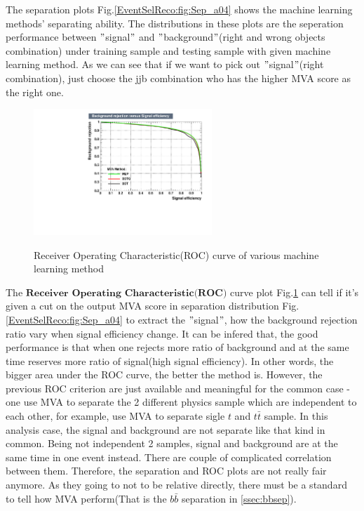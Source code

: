 			The separation plots Fig.\ref{EventSelReco:fig:Sep_a04} shows the machine learning methods' separating ability. The distributions in these plots are the seperation performance between $"$signal$"$ and $"$background$"$(right and wrong objects combination) under training sample and testing sample with given machine learning method. As we can see that if we want to pick out $"$signal$"$(right combination), just choose the jjb combination who has the higher MVA score as the right one.

\begin{figure}[H]
\centering{}
    \includegraphics[width=0.6\textwidth]{Figures/EventSelReco/a04_all_ROC.pdf}\\
\caption{Receiver Operating Characteristic(ROC) curve of various machine learning method}
\label{EventSelReco:fig:ROC_a04}
\end{figure}
\FloatBarrier
	
			The $\textbf{Receiver Operating Characteristic(ROC)}$ curve plot Fig.\ref{EventSelReco:fig:ROC_a04} can tell if it's given a cut on the output MVA score in separation distribution Fig.\ref{EventSelReco:fig:Sep_a04} to extract the $"$signal$"$, how the background rejection ratio vary when signal efficiency change. It can be infered that, the good performance is that when one rejects more ratio of background and at the same time reserves more ratio of signal(high signal efficiency). In other words, the bigger area under the ROC curve, the better the method is. However, the previous ROC criterion are just available and meaningful for the common case - one use MVA to separate the 2 different physics sample which are independent to each other, for example, use MVA to separate sigle $t$ and $t\bar{t}$ sample. In this analysis case, the signal and background are not separate like that kind in common. Being not independent 2 samples, signal and background are at the same time in one event instead. There are couple of complicated correlation between them. Therefore, the separation and ROC plots are not really fair anymore. As they going to not to be relative directly, there must be a standard to tell how MVA perform(That is the $b\bar{b}$ separation in \ref{ssec:bbsep}).

